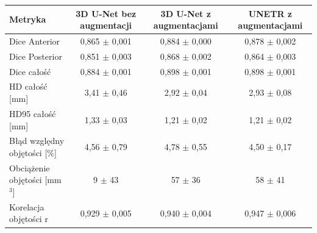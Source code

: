 \begin{tabular}{lccc}
\hline
Metryka & 3D U-Net bez augmentacji & 3D U-Net z augmentacjami & UNETR z augmentacjami \\ \hline
Dice Anterior & 0,865 $\pm$ 0,001 & 0,884 $\pm$ 0,000 & 0,878 $\pm$ 0,002 \\
Dice Posterior & 0,851 $\pm$ 0,003 & 0,868 $\pm$ 0,002 & 0,864 $\pm$ 0,003 \\
Dice całość & 0,884 $\pm$ 0,001 & 0,898 $\pm$ 0,001 & 0,898 $\pm$ 0,001 \\
HD całość [mm] & 3,41 $\pm$ 0,46 & 2,92 $\pm$ 0,04 & 2,93 $\pm$ 0,08 \\
HD95 całość [mm] & 1,33 $\pm$ 0,03 & 1,21 $\pm$ 0,02 & 1,21 $\pm$ 0,02 \\
Błąd względny objętości [\%] & 4,56 $\pm$ 0,79 & 4,78 $\pm$ 0,55 & 4,50 $\pm$ 0,17 \\
Obciążenie objętości [mm$^3$] & 9 $\pm$ 43 & 57 $\pm$ 36 & 58 $\pm$ 41 \\
Korelacja objętości r & 0,929 $\pm$ 0,005 & 0,940 $\pm$ 0,004 & 0,947 $\pm$ 0,006 \\
\hline
\end{tabular}